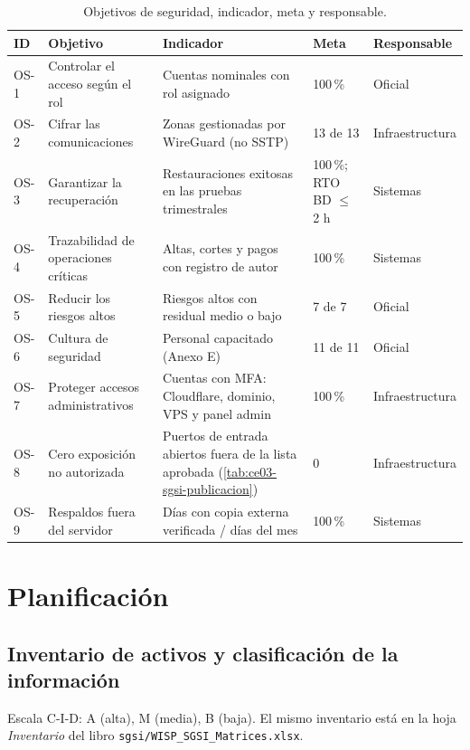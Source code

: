 \begin{table}[htbp]
\centering
\caption{Objetivos de seguridad, indicador, meta y responsable.}
\label{tab:ce03-sgsi-objetivos}
\small
\begin{tabularx}{\textwidth}{L{0.9cm}XL{3.3cm}L{1.9cm}L{2cm}}
\toprule
\textbf{ID} & \textbf{Objetivo} & \textbf{Indicador} & \textbf{Meta} & \textbf{Responsable} \\
\midrule
OS-1 & Controlar el acceso según el rol & Cuentas nominales con rol asignado & 100\,\% & Oficial \\
OS-2 & Cifrar las comunicaciones & Zonas gestionadas por WireGuard (no SSTP) & 13 de 13 & Infraestructura \\
OS-3 & Garantizar la recuperación & Restauraciones exitosas en las pruebas trimestrales & 100\,\%; RTO BD $\leq$ 2 h & Sistemas \\
OS-4 & Trazabilidad de operaciones críticas & Altas, cortes y pagos con registro de autor & 100\,\% & Sistemas \\
OS-5 & Reducir los riesgos altos & Riesgos altos con residual medio o bajo & 7 de 7 & Oficial \\
OS-6 & Cultura de seguridad & Personal capacitado (Anexo E) & 11 de 11 & Oficial \\
OS-7 & Proteger accesos administrativos & Cuentas con MFA: Cloudflare, dominio, VPS y panel admin & 100\,\% & Infraestructura \\
OS-8 & Cero exposición no autorizada & Puertos de entrada abiertos fuera de la lista aprobada (\cref{tab:ce03-sgsi-publicacion}) & 0 & Infraestructura \\
OS-9 & Respaldos fuera del servidor & Días con copia externa verificada / días del mes & 100\,\% & Sistemas \\
\bottomrule
\end{tabularx}
\end{table}

\section{Planificación}

\subsection{Inventario de activos y clasificación de la información}
\label{sec:ce03-sgsi-inventario}

Escala C-I-D: A (alta), M (media), B (baja). El mismo inventario está en la hoja
\emph{Inventario} del libro \texttt{sgsi/WISP\_SGSI\_Matrices.xlsx}.

